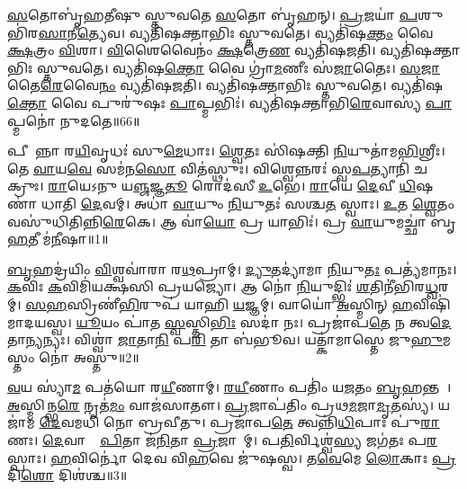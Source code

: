 \ul{𑌸}𑌤𑍋𑌬𑍃॑𑌹𑌤𑍀𑌷𑍁 𑌸𑍍𑌤𑍁𑌵𑌤𑍇 \ul{𑌸}𑌤𑍋 𑌬𑍃॑𑌹𑌨𑍍।
\ul{𑌪𑍍𑌰}𑌜𑌯𑌾॑ \ul{𑌪}𑌶𑍁𑌭𑌿॑𑌰\ul{𑌸𑌾}𑌨𑍀\ul{𑌤𑍍𑌯𑍇}𑌵।
𑌵𑍍𑌯𑌤𑌿॑𑌷𑌕𑍍𑌤𑌾𑌭𑌿𑌃 𑌸𑍍𑌤𑍁𑌵𑌤𑍇।
𑌵𑍍𑌯𑌤𑌿॑𑌷\ul{𑌕𑍍𑌤𑌂} 𑌵𑍈 \ul{𑌕𑍍𑌷}𑌤𑍍𑌰𑌂 \ul{𑌵𑌿}𑌶𑌾।
\ul{𑌵𑌿}𑌶𑍈𑌵𑍈𑌨𑌂॑ \ul{𑌕𑍍𑌷}𑌤𑍍𑌰𑍇\ul{𑌣} 𑌵𑍍𑌯𑌤𑌿॑𑌷𑌜𑌤𑌿।
𑌵𑍍𑌯𑌤𑌿॑𑌷𑌕𑍍𑌤𑌾𑌭𑌿𑌃 𑌸𑍍𑌤𑍁𑌵𑌤𑍇।
𑌵𑍍𑌯𑌤𑌿॑𑌷\ul{𑌕𑍍𑌤𑍋} 𑌵𑍈 𑌗𑍍𑌰𑌾॑\ul{𑌮}𑌣𑍀𑌃 𑌸॑\ul{𑌜𑌾}𑌤𑍈𑌃।
\ul{𑌸}\ul{𑌜𑌾}𑌤𑍈\ul{𑌰𑍇}𑌵𑍈\ul{𑌨𑌂} 𑌵𑍍𑌯𑌤𑌿॑𑌷𑌜𑌤𑌿।
𑌵𑍍𑌯𑌤𑌿॑𑌷𑌕𑍍𑌤𑌾𑌭𑌿𑌃 𑌸𑍍𑌤𑍁𑌵𑌤𑍇।
𑌵𑍍𑌯𑌤𑌿॑𑌷\ul{𑌕𑍍𑌤𑍋} 𑌵𑍈 𑌪𑍁𑌰𑍁॑𑌷𑌃 \ul{𑌪𑌾}𑌪𑍍𑌮𑌭𑌿𑌃॑।
𑌵𑍍𑌯𑌤𑌿॑𑌷𑌕𑍍𑌤𑌾𑌭𑌿\ul{𑌰𑍇}𑌵𑌾𑌸𑍍𑌯॑ \ul{𑌪𑌾}𑌪𑍍𑌮𑌨𑍋॑ 𑌨𑍁𑌦𑌤𑍇॥66॥\anuvakamend[𑌵𑍇\ul{𑌦} 𑌹𑌰॑𑌨𑍍𑌤𑍍𑌯𑍇𑌨\ul{𑌮𑍇}𑌵𑌂 𑌵𑍇\ul{𑌦𑌾}𑌭𑍍𑌯𑍂॑𑌢𑌃 \ul{𑌪𑌾}𑌪𑍍𑌮\ul{𑌭𑌿}𑌰𑍇𑌕𑌂॑ 𑌚]




\clearpage
{}
\setcounter{anuvakam}{0}

𑌪𑍀𑌵𑍋᳚𑌨𑍍𑌨𑌾 𑌰\ul{𑌯𑌿}𑌵𑍃𑌧𑌃॑ 𑌸𑍁\ul{𑌮𑍇}𑌧𑌾𑌃।
\ul{𑌶𑍍𑌵𑍇}𑌤𑌃 𑌸𑌿॑𑌷𑌕𑍍𑌤𑌿 \ul{𑌨𑌿}𑌯𑍁𑌤𑌾॑\-𑌮\ul{𑌭𑌿}𑌶𑍍𑌰𑍀𑌃।
𑌤𑍇 \ul{𑌵𑌾}𑌯\ul{𑌵𑍇} 𑌸𑌮॑𑌨\ul{𑌸𑍋} 𑌵𑌿𑌤॑𑌸𑍍𑌥𑍁𑌃।
𑌵𑌿𑌶𑍍𑌵𑍇𑌨𑍍𑌨𑌰𑌃॑ 𑌸𑍍𑌵\ul{𑌪}𑌤𑍍𑌯𑌾𑌨𑌿॑ 𑌚𑌕𑍍𑌰𑍁𑌃।
\ul{𑌰𑌾}𑌯𑍇𑌽𑌨𑍁 𑌯\ul{𑌞𑍍𑌜}𑌜𑍍𑌞\ul{𑌤𑍂} 𑌰𑍋𑌦॑𑌸𑍀 \ul{𑌉}𑌭𑍇।
\ul{𑌰𑌾}𑌯𑍇 \ul{𑌦𑍇}𑌵𑍀 \ul{𑌧𑌿}𑌷𑌣𑌾॑ 𑌧𑌾𑌤𑌿 \ul{𑌦𑍇}𑌵𑌮𑍍।
𑌅𑌧𑌾॑ \ul{𑌵𑌾}𑌯𑍁𑌂 \ul{𑌨𑌿}𑌯𑍁𑌤𑌃॑ 𑌸𑌶𑍍𑌚\ul{𑌤} 𑌸𑍍𑌵𑌾𑌃।
\ul{𑌉}𑌤 \ul{𑌶𑍍𑌵𑍇}𑌤𑌂 𑌵𑌸𑍁॑𑌧𑌿𑌤𑌿𑌨𑍍𑌨𑌿\ul{𑌰𑍇}𑌕𑍇।
𑌆 𑌵𑌾॑\ul{𑌯𑍋} 𑌪𑍍𑌰 𑌯𑌾𑌭𑌿𑌃॑।
𑌪𑍍𑌰 \ul{𑌵𑌾}𑌯𑍁𑌮𑌚𑍍𑌛𑌾॑ 𑌬𑍃\ul{𑌹}𑌤𑍀 𑌮॑\ul{𑌨𑍀}𑌷𑌾॥1॥

\ul{𑌬𑍃}𑌹𑌦𑍍𑌰॑𑌯𑌿𑌂 \ul{𑌵𑌿}𑌶𑍍𑌵𑌵𑌾॑𑌰𑌾 𑌰\ul{𑌥}𑌪𑍍𑌰𑌾𑌮𑍍।
\ul{𑌦𑍍𑌯𑍁}𑌤𑌦𑍍𑌯𑌾॑𑌮𑌾 \ul{𑌨𑌿}𑌯𑍁\ul{𑌤𑌃} 𑌪𑌤𑍍𑌯॑𑌮𑌾𑌨𑌃।
\ul{𑌕}𑌵𑌿𑌃 \ul{𑌕}𑌵𑌿𑌮𑌿॑𑌯𑌕𑍍𑌷𑌸𑌿 𑌪𑍍𑌰𑌯𑌜𑍍𑌯𑍋।
𑌆 𑌨𑍋॑ \ul{𑌨𑌿}𑌯𑍁𑌦𑍍𑌭𑌿𑌃॑ \ul{𑌶}𑌤𑌿𑌨𑍀॑𑌭𑌿𑌰\ul{𑌧𑍍𑌵}𑌰𑌮𑍍।
\ul{𑌸}\ul{𑌹}𑌸𑍍𑌰𑌿𑌣𑍀॑\ul{𑌭𑌿}𑌰𑍁𑌪॑ 𑌯𑌾𑌹𑌿 \ul{𑌯}𑌜𑍍𑌞𑌮𑍍।
𑌵𑌾𑌯𑍋॑ \ul{𑌅}𑌸𑍍𑌮𑌿𑌨𑍍 \ul{𑌹}𑌵𑌿𑌷𑌿॑ 𑌮𑌾𑌦𑌯𑌸𑍍𑌵।
\ul{𑌯𑍂}𑌯𑌂 𑌪𑌾॑𑌤 \ul{𑌸𑍍𑌵}𑌸𑍍𑌤𑌿\ul{𑌭𑌿𑌃} 𑌸𑌦𑌾॑ 𑌨𑌃।
𑌪𑍍𑌰𑌜𑌾॑𑌪\ul{𑌤𑍇} 𑌨 𑌤𑍍𑌵\ul{𑌦𑍇}𑌤𑌾\ul{𑌨𑍍𑌯}𑌨𑍍𑌯𑌃।
𑌵𑌿𑌶𑍍𑌵𑌾॑ \ul{𑌜𑌾}𑌤𑌾\ul{𑌨𑌿} 𑌪\ul{𑌰𑌿} 𑌤𑌾 𑌬॑𑌭𑍂𑌵।
𑌯𑌤𑍍𑌕𑌾॑𑌮𑌾𑌸𑍍𑌤𑍇 𑌜𑍁\ul{𑌹𑍁}𑌮𑌸𑍍𑌤𑌂 𑌨𑍋॑ 𑌅𑌸𑍍𑌤𑍁॥2॥

\ul{𑌵}𑌯 𑌸𑍍𑌯𑌾॑\ul{𑌮} 𑌪𑌤॑𑌯𑍋 𑌰\ul{𑌯𑍀}𑌣𑌾𑌮𑍍।
\ul{𑌰}\ul{𑌯𑍀}𑌣𑌾𑌂 𑌪𑌤𑌿𑌂॑ 𑌯\ul{𑌜}𑌤𑌂 \ul{𑌬𑍃}𑌹𑌨𑍍𑌤𑌮𑍍᳚।
\ul{𑌅}𑌸𑍍𑌮𑌿𑌨𑍍𑌭\ul{𑌰𑍇} 𑌨𑍃𑌤॑\ul{𑌮𑌂} 𑌵𑌾𑌜॑𑌸𑌾𑌤𑍗।
\ul{𑌪𑍍𑌰}𑌜𑌾𑌪॑𑌤𑌿𑌂 𑌪𑍍𑌰𑌥\ul{𑌮}𑌜𑌾\ul{𑌮𑍃}𑌤𑌸𑍍𑌯॑।
𑌯𑌜𑌾॑𑌮 \ul{𑌦𑍇}𑌵𑌮𑌧𑌿॑ 𑌨𑍋 𑌬𑍍𑌰𑌵𑍀𑌤𑍁।
𑌪𑍍𑌰𑌜𑌾॑𑌪\ul{𑌤𑍇} 𑌤𑍍𑌵𑌨𑍍𑌨𑌿॑\ul{𑌧𑌿}𑌪𑌾𑌃 𑌪𑍁॑\ul{𑌰𑌾}𑌣𑌃।
\ul{𑌦𑍇}𑌵𑌾𑌨𑌾𑌂᳚ \ul{𑌪𑌿}𑌤𑌾 𑌜॑\ul{𑌨𑌿}𑌤𑌾 \ul{𑌪𑍍𑌰}𑌜𑌾𑌨𑌾᳚𑌮𑍍।
𑌪\ul{𑌤𑌿}𑌰𑍍𑌵𑌿𑌶𑍍𑌵॑\ul{𑌸𑍍𑌯} 𑌜𑌗॑𑌤𑌃 𑌪\ul{𑌰}𑌸𑍍𑌪𑌾𑌃।
\ul{𑌹}𑌵𑌿𑌰𑍍𑌨𑍋॑ 𑌦𑍇𑌵 𑌵𑌿\ul{𑌹}𑌵𑍇 𑌜𑍁॑𑌷𑌸𑍍𑌵।
𑌤\ul{𑌵𑍇}𑌮𑍇 \ul{𑌲𑍋}𑌕𑌾𑌃 \ul{𑌪𑍍𑌰}𑌦𑌿\ul{𑌶𑍋} 𑌦𑌿𑌶॑𑌶𑍍𑌚॥3॥

